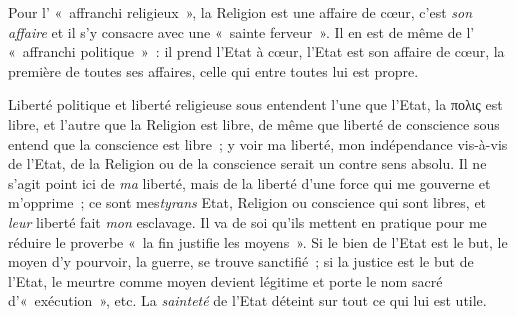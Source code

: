\documentclass[french,twoside]{book} %
\begin{document}
Pour l’ « affranchi religieux », la Religion est une affaire de cœur, c’est \emph{son affaire} et il s’y consacre avec une « sainte ferveur ». Il en est de même de l’ « affranchi politique » : il prend l’Etat à cœur, l’Etat est son affaire de cœur, la première de toutes ses affaires, celle qui entre toutes lui est propre.\par
Liberté politique et liberté religieuse sous entendent l’une que l’Etat, la πολις est libre, et l’autre que la Religion est libre, de même que liberté de conscience sous entend que la conscience est libre ; y voir ma liberté, mon indépendance vis-à-vis de l’Etat, de la Religion ou de la conscience serait un contre sens absolu. Il ne s’agit point ici de \emph{ma} liberté, mais de la liberté d’une force qui me gouverne et m’opprime ; ce sont mes\emph{tyrans} Etat, Religion ou conscience qui sont libres, et \emph{leur }liberté fait \emph{mon} esclavage. Il va de soi qu’ils mettent en pratique pour me réduire le proverbe « la fin justifie les moyens ». Si le bien de l’Etat est le but, le moyen d’y pourvoir, la guerre, se trouve sanctifié ; si la justice est le but de l’Etat, le meurtre comme moyen devient légitime et porte le nom sacré d’« exécution », etc. La \emph{sainteté} de l’Etat déteint sur tout ce qui lui est utile.\par
\end{document}
